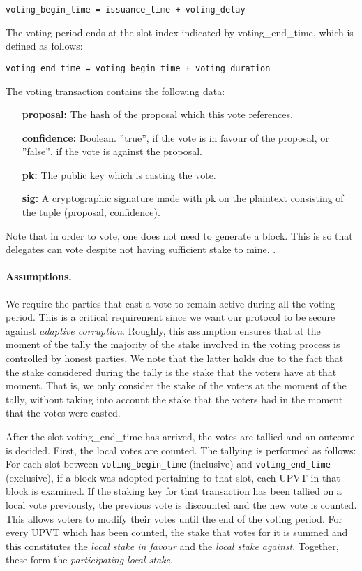 \begin{verbatim}
voting_begin_time = issuance_time + voting_delay
\end{verbatim}

The voting period ends at the slot index indicated by voting\_end\_time, which is defined as follows:

\begin{verbatim}
voting_end_time = voting_begin_time + voting_duration
\end{verbatim}

The voting transaction contains the following data:
\begin{itemize}
\item[\textbf{proposal:}] The hash of the proposal which this vote references.
\item[\textbf{confidence:}] Boolean. ''true'', if the vote is in favour of the proposal, or ''false'', if the vote is against the proposal.
\item[\textbf{pk:}] The public key which is casting the vote.
\item[\textbf{sig:}] A cryptographic signature made with pk on the plaintext consisting of the tuple (proposal, confidence).
\end{itemize}

Note that in order to vote, one does not need to generate a block. This is so that delegates can vote despite not having sufficient stake to mine.
.
\paragraph{Assumptions.} We require the parties that cast a vote to remain active during all the voting
period. This is a critical requirement since we want our protocol to be secure against \emph{adaptive corruption}. Roughly, this assumption ensures that at the moment of the tally the majority
of the stake involved in the voting process is controlled by honest parties.
We note that the latter holds due to the fact that the stake considered during the tally is the stake 
that the voters have at that moment. That is, we only consider the stake of the voters at the moment of
the tally, without taking into account the stake that the voters had in the moment that the votes were casted.  



After the slot voting\_end\_time has arrived, the votes are tallied and an outcome is decided. First, the local votes are counted. The tallying is performed as follows: For each slot between \verb;voting_begin_time; (inclusive) and \verb;voting_end_time; (exclusive), if a block was adopted pertaining to that slot, each UPVT in that block is examined. If the staking key for that transaction has been tallied on a local vote previously, the previous vote is discounted and the new vote is counted. This allows voters to modify their votes until the end of the voting period. For every UPVT which has been counted, the stake that votes for it is summed and this constitutes the \emph{local stake in favour} and the \emph{local stake against}. Together, these form the \emph{participating local stake}.

